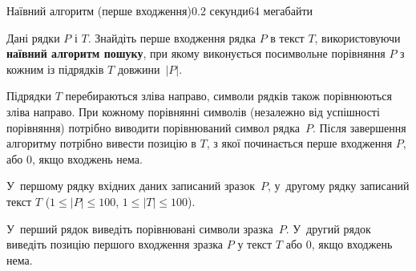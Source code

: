 \begin{problem}{Наївний алгоритм (перше входження)}{}{}{0.2 секунди}{64 мегабайти}

Дані рядки $P$ і $T$. Знайдіть перше входження рядка $P$ в текст $T$, використовуючи {\bf наївний алгоритм пошуку}, 
при якому виконується посимвольне порівняння $P$ з кожним із підрядків $T$ довжини~$|P|$. 

Підрядки $T$ перебираються зліва направо, символи рядків також порівнюються зліва направо. 
При кожному порівнянні символів (незалежно від успішності порівняння) потрібно виводити порівнюваний символ рядка~$P$. 
Після завершення алгоритму потрібно вивести позицію в $T$, з якої починається перше входження $P$, або $0$, якщо входжень нема.

\InputFile
У~першому рядку вхідних даних записаний зразок~$P$, 
у~другому рядку записаний текст $T$ ($1 \le |P| \le 100$, $1 \le |T| \le 100$).


\OutputFile
У~перший рядок виведіть порівнювані символи зразка~$P$.
У~другий рядок виведіть позицію першого входження зразка $P$ у текст $T$ або $0$, якщо входжень нема.


\Examples

\begin{example}
%
\end{example}

\end{problem}

